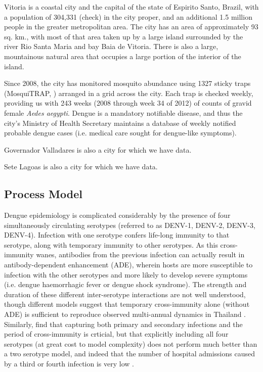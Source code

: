 \documentclass[10pt,letterpaper]{article}
\begin{document}
Vitoria is a coastal city and the capital of the state of Espirito Santo, Brazil, with a population of 304,331 (check) in the city proper, and an additional 1.5 million people in the greater metropolitan area.  
The city has an area of approximately 93 sq. km., with most of that area taken up by a large island surrounded by the river Rio Santa Maria and bay Baia de Vitoria.  
There is also a large, mountainous natural area that occupies a large portion of the interior of the island.

Since 2008, the city has monitored mosquito abundance using 1327 sticky traps (MosquiTRAP, \cite{Eiras2009}) arranged in a grid across the city.
Each trap is checked weekly, providing us with 243 weeks (2008 through week 34 of 2012) of counts of gravid female \emph{Aedes aegypti}.
Dengue is a mandatory notifiable disease, and thus the city's Ministry of Health Secretary maintains a database of weekly notified probable dengue cases (i.e. medical care sought for dengue-like symptoms).

Governador Valladares is also a city for which we have data.

Sete Lagoas is also a city for which we have data.


\subsection*{Process Model}

Dengue epidemiology is complicated considerably by the presence of four simultaneously circulating serotypes (referred to as DENV-1, DENV-2, DENV-3, DENV-4).
Infection with one serotype confers life-long immunity to that serotype, along with temporary immunity to other serotypes.  
As this cross-immunity wanes, antibodies from the previous infection can actually result in antibody-dependent enhancement (ADE), wherein hosts are more susceptible to infection with the other serotypes and more likely to develop severe symptoms (i.e. dengue haemorrhagic fever or dengue shock syndrome).
The strength and duration of these different inter-serotype interactions are not well understood, though different models suggest that temporary cross-immunity alone (without ADE) is sufficient to reproduce observed multi-annual dynamics in Thailand \cite{Wearing2006,Reich2013}.
Similarly, \cite{Aguiar2013} find that capturing both primary and secondary infections and the period of cross-immunity is crticial, but that explicitly including all four serotypes (at great cost to model complexity) does not perform much better than a two serotype model, and indeed that the number of hospital admissions caused by a third or fourth infection is very low \cite{Aguiar2011a}.
\end{document}
